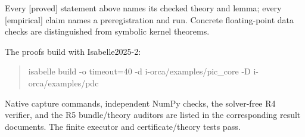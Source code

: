 \documentclass[11pt]{article}
\newcommand{\status}[1]{\textsf{[#1]}}
\begin{document}
Every \status{proved} statement above names its checked theory and lemma;
every \status{empirical} claim names a preregistration and run. Concrete
floating-point data checks are distinguished from symbolic kernel theorems.

The proofs build with Isabelle2025-2:
\begin{quote}\small\ttfamily
isabelle build -o timeout=40 -d i-orca/examples/pic\_core -D i-orca/examples/pdc
\end{quote}
Native capture commands, independent NumPy checks, the solver-free R4
verifier, and the R5 bundle/theory auditors are listed in the corresponding
result documents. The finite executor and certificate/theory tests pass.
\end{document}
